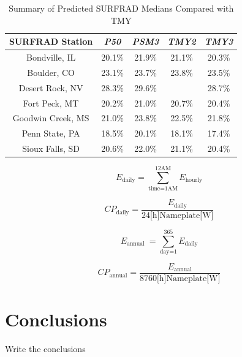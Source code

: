 \documentclass[conference]{IEEEtran}
\begin{document}
\begin{table}[htbp]
\caption{Summary of Predicted SURFRAD Medians Compared with TMY}
\begin{center}
\begin{tabular}{|c|c|c|c|c|}
\hline
\textbf{SURFRAD Station} & \textbf{\textit{P50}}& \textbf{\textit{PSM3}}& \textbf{\textit{TMY2}}& \textbf{\textit{TMY3}} \\
\hline
Bondville, IL    & 20.1\%& 21.9\%& 21.1\%& 20.3\% \\
Boulder, CO      & 23.1\%& 23.7\%& 23.8\%& 23.5\% \\
Desert Rock, NV  & 28.3\%& 29.6\%&       & 28.7\% \\
Fort Peck, MT    & 20.2\%& 21.0\%& 20.7\%& 20.4\% \\
Goodwin Creek, MS& 21.0\%& 23.8\%& 22.5\%& 21.8\% \\
Penn State, PA   & 18.5\%& 20.1\%& 18.1\%& 17.4\% \\
Sioux Falls, SD  & 20.6\%& 22.0\%& 21.1\%& 20.4\% \\
\hline
\end{tabular}
\label{table:surfrad-tmy-summary}
\end{center}
\end{table}

\begin{equation}
E_\text{daily} = \sum_\text{time=1AM}^\text{12AM}{E_\text{hourly}} \label{eq:daily-enregy}
\end{equation}

\begin{equation}
\mathit{CP}_\text{daily} = \frac{E_\text{daily}}{ 24\text{[h]} \text{Nameplate[W]} } \label{eq:daily-capacity-factor}
\end{equation}

\begin{equation}
E_\text{annual }= \sum_\text{day=1}^\text{365}{E_\text{daily}} \label{eq:annual-energy}
\end{equation}

\begin{equation}
\mathit{CP}_\text{annual} = \frac{E_\text{annual}}{ 8760\text{[h]} \text{Nameplate[W]} } \label{eq:annual-capacity-factor}
\end{equation}

\section{Conclusions}
Write the conclusions



\end{document}
